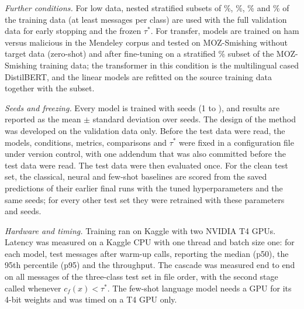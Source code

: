 \emph{Further conditions.} For low data, nested stratified subsets of \%, \%, \% and \% of the training data (at least  messages per class) are used with the full validation data for early stopping and the frozen $\tau^{*}$. For transfer, models are trained on ham versus malicious in the Mendeley corpus and tested on MOZ-Smishing without target data (zero-shot) and after fine-tuning on a stratified \% subset of the MOZ-Smishing training data; the transformer in this condition is the multilingual cased DistilBERT, and the linear models are refitted on the source training data together with the subset.

\emph{Seeds and freezing.} Every model is trained with  seeds (1 to ), and results are reported as the mean $\pm$ standard deviation over seeds. The design of the method was developed on the validation data only. Before the test data were read, the models, conditions, metrics, comparisons and $\tau^{*}$ were fixed in a configuration file under version control, with one addendum that was also committed before the test data were read. The test data were then evaluated once. For the clean test set, the classical, neural and few-shot baselines are scored from the saved predictions of their earlier final runs with the tuned hyperparameters and the same seeds; for every other test set they were retrained with these parameters and seeds.

\emph{Hardware and timing.} Training ran on Kaggle with two NVIDIA T4 GPUs. Latency was measured on a Kaggle CPU with one thread and batch size one: for each model,  test messages after  warm-up calls, reporting the median (p50), the 95th percentile (p95) and the throughput. The cascade was measured end to end on all  messages of the three-class test set in file order, with the second stage called whenever $c_f(x)<\tau^{*}$. The few-shot language model needs a GPU for its 4-bit weights and was timed on a T4 GPU only.
